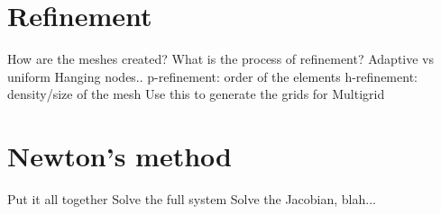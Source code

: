
\section{Refinement}

How are the meshes created?
What is the process of refinement?
	Adaptive vs uniform
Hanging nodes..
p-refinement: order of the elements
h-refinement: density/size of the mesh
Use this to generate the grids for Multigrid










\section{Newton's method}

Put it all together
Solve the full system
Solve the Jacobian, blah...
